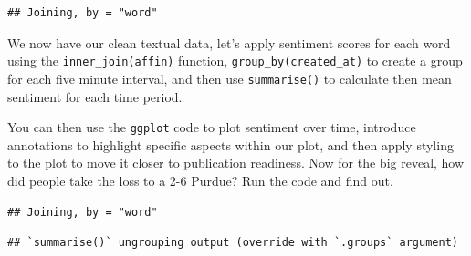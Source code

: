\documentclass[
]{book}
\newenvironment{Shaded}{\begin{snugshade}}{\end{snugshade}}
\newcommand{\DataTypeTok}[1]{\textcolor[rgb]{0.13,0.29,0.53}{#1}}
\newcommand{\KeywordTok}[1]{\textcolor[rgb]{0.13,0.29,0.53}{\textbf{#1}}}
\newcommand{\NormalTok}[1]{#1}
\newcommand{\OperatorTok}[1]{\textcolor[rgb]{0.81,0.36,0.00}{\textbf{#1}}}
\newcommand{\StringTok}[1]{\textcolor[rgb]{0.31,0.60,0.02}{#1}}
\begin{document}
\begin{verbatim}
## Joining, by = "word"
\end{verbatim}

We now have our clean textual data, let's apply sentiment scores for each word using the \texttt{inner\_join(affin)} function, \texttt{group\_by(created\_at)} to create a group for each five minute interval, and then use \texttt{summarise()} to calculate then mean sentiment for each time period.

You can then use the \texttt{ggplot} code to plot sentiment over time, introduce annotations to highlight specific aspects within our plot, and then apply styling to the plot to move it closer to publication readiness. Now for the big reveal, how did people take the loss to a 2-6 Purdue? Run the code and find out.

\begin{Shaded}
\end{Shaded}

\begin{verbatim}
## Joining, by = "word"
\end{verbatim}

\begin{verbatim}
## `summarise()` ungrouping output (override with `.groups` argument)
\end{verbatim}
\end{document}
